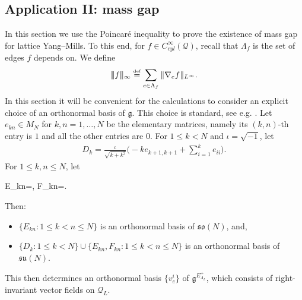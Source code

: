 \documentclass[11pt,UTF-8,reqno]{amsart}
\numberwithin{equation}{section}
\def\${|\!|\!|}
\newcommand{\eqdef}{\stackrel{\mbox{\tiny def}}{=}}
\def\cQ{{\mathcal Q}}
\def\leq{\leqslant}
\def\so{\mathfrak{so}}
\def\su{\mathfrak{su}}
\def\mfg{\mathfrak{g}}
\def\leq{\leqslant}
\begin{document}






\subsection{Application II: mass gap}

In this section we use the Poincar\'e inequality to prove the existence of mass gap for  lattice Yang--Mills. To this end, 
for $f\in C^\infty_{cyl}(\cQ)$,  recall that  $\Lambda_f$ is the set of edges $f$ depends on. We define
\begin{align*}
	\$f\$_{\infty}\eqdef \sum_{e\in \Lambda_f}\|\nabla_{e}f\|_{L^\infty}.
\end{align*}
In this section it will be convenient for the calculations to consider an explicit choice of an orthonormal basis
of $\mfg$. This choice is standard, see e.g. \cite[Proposition E.15]{AGZ}.
Let $e_{kn}\in M_N$ for $k,n=1,\dots, N$ be the elementary matrices, namely its $(k,n)$-th entry is $1$ and all the other entries are $0$.
For $1\leq k< N$ and $\iota=\sqrt{-1}$, let
\begin{align*}
	D_k=\frac{\iota}{\sqrt{k+k^2}}\Big(-ke_{k+1,k+1}+\sum_{i=1}^ke_{ii}\Big).
\end{align*}
For $1\leq k,n\leq N$, let 
\begin{equ}[e:def-EF]
	E_{kn}=,\quad
	F_{kn}=.
\end{equ}
Then:
\begin{itemize}
\item
$\{E_{kn}:1\leq k<n\leq N\}$ is an orthonormal basis of $\so(N)$, and,
\item
$\{D_k:1\leq k< N\}\cup\{E_{kn},F_{kn}:1\leq k<n\leq N\}$ is an orthonormal basis of $\su(N)$.
\end{itemize}
This then determines an orthonormal basis $\{v_e^i\}$ of $\mfg^{E^+_{\Lambda_L}}$, which consists of right-invariant vector fields on $\cQ_L$.
\end{document}
